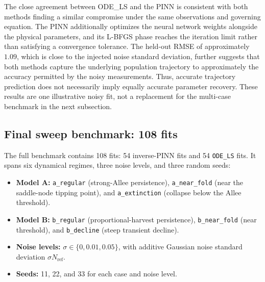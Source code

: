 The close agreement between ODE\_LS and the PINN is consistent with
both methods finding a similar compromise under the same observations
and governing equation. The PINN additionally optimizes the neural
network weights alongside the physical parameters, and its L-BFGS
phase reaches the iteration limit rather than satisfying a
convergence tolerance. The held-out RMSE of approximately $1.09$,
which is close to the injected noise standard deviation, further
suggests that both methods capture the underlying population
trajectory to approximately the accuracy permitted by the noisy
measurements. Thus, accurate trajectory prediction does not
necessarily imply equally accurate parameter recovery. These results
are one illustrative noisy fit, not a replacement for the multi-case
benchmark in the next subsection.

\subsection{Final sweep benchmark: 108 fits}
\label{sec:benchmark}

The full benchmark contains 108 fits: 54 inverse-PINN fits and 54
\texttt{ODE\_LS} fits. It spans six dynamical regimes, three noise levels,
and three random seeds:
\begin{itemize}
  \item \textbf{Model A:} \texttt{a\_regular} (strong-Allee persistence),
  \texttt{a\_near\_fold} (near the saddle-node tipping point), and
  \texttt{a\_extinction} (collapse below the Allee threshold).
  \item \textbf{Model B:} \texttt{b\_regular} (proportional-harvest
  persistence), \texttt{b\_near\_fold} (near threshold), and
  \texttt{b\_decline} (steep transient decline).
  \item \textbf{Noise levels:} $\sigma\in\{0,0.01,0.05\}$, with additive
  Gaussian noise standard deviation $\sigma N_{\mathrm{ref}}$.
  \item \textbf{Seeds:} 11, 22, and 33 for each case and noise level.
\end{itemize}

